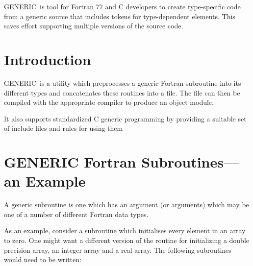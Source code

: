 \documentclass[twoside,11pt]{article}
\newcommand{\stardocinitials}  {SUN}
\newcommand{\stardocnumber}    {7.5}
\newcommand{\stardocname}{\stardocinitials /\stardocnumber}
\renewcommand{\_}{{\tt\char'137}}     %
\newenvironment{latexonly}{}{}
\newcommand{\latexonlytoc}[0]{\tableofcontents}
\newcommand{\GENERIC}{{\footnotesize GENERIC}\normalsize}
\renewcommand{\thepage}{\roman{page}}
\begin{document}
\GENERIC\ is tool for Fortran 77 and C developers to create type-specific
code from a generic source that includes tokens for type-dependent
elements.  This saves effort supporting multiple versions of the
source code.

 \newpage
 \begin{latexonly}
   \setlength{\parskip}{0mm}
   \latexonlytoc
   \setlength{\parskip}{\medskipamount}
   \markboth{\stardocname}{\stardocname}
 \end{latexonly}
\cleardoublepage
\renewcommand{\thepage}{\arabic{page}}
\setcounter{page}{1}


\section{Introduction}

\GENERIC\ is a utility which preprocesses a generic Fortran subroutine
into its different types and concatenates these routines into a file.
The file can then be compiled with the appropriate compiler to produce an
object module.

It also supports standardized C generic programming by providing a suitable
set of include files and rules for using them

\section{GENERIC Fortran Subroutines---an Example}

A generic subroutine is one which has an argument (or arguments)
which may be one of a number of different Fortran data types.

As an example, consider a subroutine which initialises every
element in an array to zero.
One might want a different version of the routine for initializing
a double precision array, an integer array and a real array.
The following subroutines would need to be written:
\end{document}
